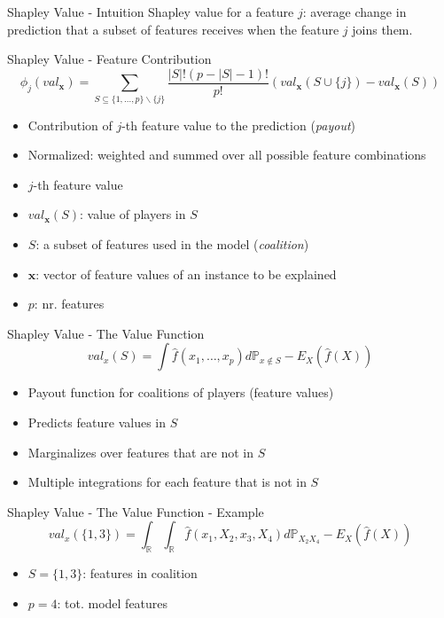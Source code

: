 \begin{frame}{Shapley Value - Intuition}
 Shapley value for a feature $j$: average change in prediction that a subset of features receives when the feature $j$ joins them.
\end{frame}
\begin{frame}{Shapley Value - Feature Contribution}
\begin{equation}
	\phi_j(val_{\bm{x}})=\sum_{S\subseteq\{1,\ldots,p\} \backslash \{j\}}\frac{|S|!\left(p-|S|-1\right)!}{p!}\left(val_{\bm{x}}\left(S\cup\{j\}\right)-val_{\bm{x}}(S)\right)
\end{equation}
\begin{itemize}
	\item Contribution of $j$-th feature value to the prediction (\emph{payout})
	\item Normalized: weighted and summed over all possible feature combinations
	\item $j$-th feature value
	\item $val_{\bm{x}}(S)$: value of players in $S$ %
	\item $S$: a subset of features used in the model (\emph{coalition})
	\item $\bm{x}$: vector of feature values of an instance to be explained
	\item $p$: nr. features
\end{itemize}
\end{frame}

\begin{frame}{Shapley Value - The Value Function}
\begin{equation}
	val_{x}(S)=\int\hat{f}(x_{1},\ldots,x_{p})d\mathbb{P}_{x\notin{}S}-E_X(\hat{f}(X))
\end{equation}
\begin{itemize}
	\item Payout function for coalitions of players (feature values)
	\item Predicts feature values in $S$
	\item Marginalizes over features that are not in $S$
	\item Multiple integrations for each feature that is not in $S$
\end{itemize}
\end{frame}

\begin{frame}{Shapley Value - The Value Function - Example}
\begin{equation}
val_{x}(\{1,3\})=\int_{\mathbb{R}}\int_{\mathbb{R}}\hat{f}(x_{1},X_{2},x_{3},X_{4})d\mathbb{P}_{X_2X_4}-E_X(\hat{f}(X))
\end{equation}
\begin{itemize}
	\item $S = \{1,3\}$: features in coalition
	\item $p = 4$: tot. model features
\end{itemize}
\end{frame}

